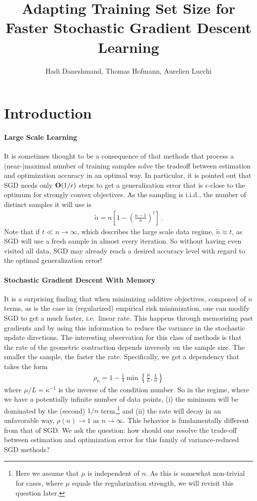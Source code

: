 \documentclass{article}
\title{Adapting Training Set Size for  \\ 
Faster Stochastic Gradient Descent Learning}
\author{Hadi Daneshmand, Thomas Hofmann, Aurelien Lucchi}
\newcommand{\bigO}{{\bf O}}
\begin{document}
\maketitle 

\section{Introduction} 

\paragraph{Large Scale Learning} It is sometimes thought to be a consequence of \cite{bousquet2008tradeoffs} that methods that process a (near-)maximal number of training samples solve the tradeoff between estimation and optimization accuracy in an optimal way. In particular, it is pointed out that SGD needs only $\bigO(1/\epsilon)$ steps to get a generalization error that is $\epsilon$-close to the optimum for strongly convex objectives. As the sampling is i.i.d., the number of distinct samples it will use is
\begin{align}
\tilde n = n \left[1 - \left(\frac{n-1}{n} \right)^t \right]\,.
\end{align}
Note that if $t \ll n \to \infty$, which describes the large scale data regime, $\tilde n \approx t$, as SGD will use a fresh sample in almost every iteration. So without having even visited all data, SGD may already reach a desired accuracy level with regard to the optimal generalization error! 

\paragraph{Stochastic Gradient Descent With Memory} It is a surprising finding that when minimizing additive objectives, composed of $n$ terms, as is the case in (regularized) empirical risk minimization, one can modify SGD to get a much faster, i.e.~linear rate. This happens through memorizing past gradients and by using this information to reduce the variance in the stochastic update directions. The interesting observation for this class of methods is that the rate of the geometric contraction depends inversely on the sample size. The smaller the sample, the faster the rate. Specifically, we get a dependency that takes the form
\begin{align}
\rho_n = 1 - \frac 14 \min \left\{ \frac \mu L, \frac 1 n \right\}
\end{align}
where $\mu/L = \kappa^{-1}$ is the inverse of the condition number. So in the regime, where we have a potentially infinite number of data points, (i) the minimum will be dominated by the (second) $1/n$ term,\footnote{Here we assume that $\mu$ is independent of $n$. As this is somewhat non-trivial for cases, where $\mu$ equals the regularization strength, we will revisit this question later.}  and (ii) the rate will decay in an unfavorable way, $\rho(n) \to 1$ as $n \to \infty$. This  behavior is fundamentally different from that of SGD. We ask the question: how should one resolve the trade-off between estimation and optimization error for this family of variance-reduced SGD methods?
\end{document}
